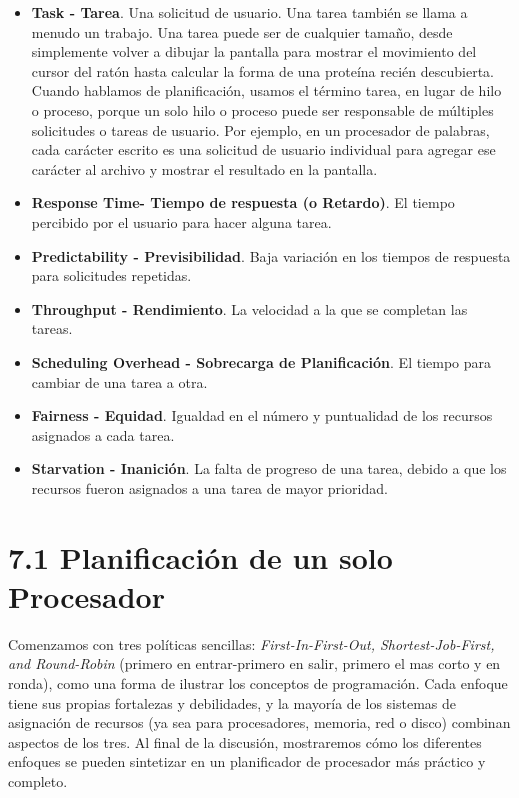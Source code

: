 \documentclass[10pt]{book}
\begin{document}
\begin{itemize}
\item \textbf{Task - Tarea}. Una solicitud de usuario. Una tarea también se llama a menudo un trabajo. Una tarea puede ser de cualquier tamaño, desde simplemente volver a dibujar la pantalla para mostrar el movimiento del cursor del ratón hasta calcular la forma de una proteína recién descubierta. Cuando hablamos de planificación, usamos el término tarea, en lugar de hilo o proceso, porque un solo hilo o proceso puede ser responsable de múltiples solicitudes o tareas de usuario. Por ejemplo, en un procesador de palabras, cada carácter escrito es una solicitud de usuario individual para agregar ese carácter al archivo y mostrar el resultado en la pantalla.
\item \textbf{Response Time- Tiempo de respuesta (o Retardo)}. El tiempo percibido por el usuario para hacer alguna tarea.
\item \textbf{Predictability - Previsibilidad}. Baja variación en los tiempos de respuesta para solicitudes repetidas.
\item \textbf{Throughput - Rendimiento}. La velocidad a la que se completan las tareas.
\item \textbf{Scheduling Overhead - Sobrecarga de Planificación}. El tiempo para cambiar de una tarea a otra.
\item \textbf{Fairness - Equidad}. Igualdad en el número y puntualidad de los recursos asignados a cada tarea.
\item \textbf{Starvation - Inanición}. La falta de progreso de una tarea, debido a que los recursos fueron asignados a una tarea de mayor prioridad.
\end{itemize}

\section{7.1 Planificación de un solo Procesador}
Comenzamos con tres políticas sencillas: \textit{First-In-First-Out, Shortest-Job-First, and Round-Robin} (primero en entrar-primero en salir, primero el mas corto y en ronda), como una forma de ilustrar los conceptos de programación. Cada enfoque tiene sus propias fortalezas y debilidades, y la mayoría de los sistemas de asignación de recursos (ya sea para procesadores, memoria, red o disco) combinan aspectos de los tres. Al final de la discusión, mostraremos cómo los diferentes enfoques se pueden sintetizar en un planificador de procesador más práctico y completo.
\end{document}

